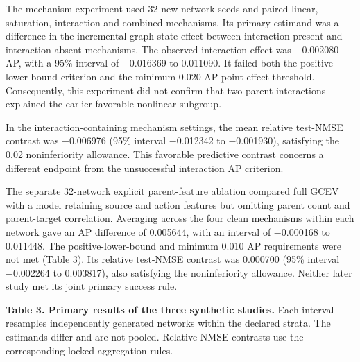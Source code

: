 \documentclass[
  11pt,
]{article}
\begin{document}
The mechanism experiment used 32 new network seeds and paired linear,
saturation, interaction and combined mechanisms. Its primary estimand
was a difference in the incremental graph-state effect between
interaction-present and interaction-absent mechanisms. The observed
interaction effect was −0.002080 AP, with a 95\% interval of −0.016369
to 0.011090. It failed both the positive-lower-bound criterion and the
minimum 0.020 AP point-effect threshold. Consequently, this experiment
did not confirm that two-parent interactions explained the earlier
favorable nonlinear subgroup.

In the interaction-containing mechanism settings, the mean relative
test-NMSE contrast was −0.006976 (95\% interval −0.012342 to −0.001930),
satisfying the 0.02 noninferiority allowance. This favorable predictive
contrast concerns a different endpoint from the unsuccessful interaction
AP criterion.

The separate 32-network explicit parent-feature ablation compared full
GCEV with a model retaining source and action features but omitting
parent count and parent-target correlation. Averaging across the four
clean mechanisms within each network gave an AP difference of 0.005644,
with an interval of −0.000168 to 0.011448. The positive-lower-bound and
minimum 0.010 AP requirements were not met (Table 3). Its relative
test-NMSE contrast was 0.000700 (95\% interval −0.002264 to 0.003817),
also satisfying the noninferiority allowance. Neither later study met
its joint primary success rule.

\textbf{Table 3. Primary results of the three synthetic studies.} Each
interval resamples independently generated networks within the declared
strata. The estimands differ and are not pooled. Relative NMSE contrasts
use the corresponding locked aggregation rules.
\end{document}
